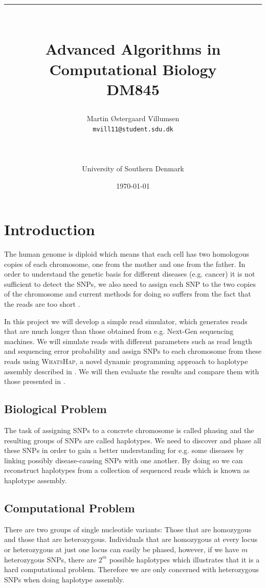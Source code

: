 \documentclass[10pt,a4paper]{article}
\title{\rule{12.5cm}{0.5mm}\\Advanced Algorithms in Computational Biology\\DM845}
\author{Martin Østergaard Villumsen\\\texttt{mvill11@student.sdu.dk}\\\rule{6.5cm}{0.5mm}\\University of Southern Denmark\\}
\date{\today}
\begin{document}
\maketitle
\newpage

\section{Introduction}
The human genome is diploid which means that each cell has two homologous copies of each chromosome, one from the mother and one from the father. In order to understand the genetic basis for different diseases (e.g. cancer) it is not sufficient to detect the SNPs, we also need to assign each SNP to the two copies of the chromosome and current methods for doing so suffers from the fact that the reads are too short \cite{whatshap}.

In this project we will develop a simple read simulator, which generates reads that are much longer than those obtained from e.g. Next-Gen sequencing machines. We will simulate reads with different parameters such as read length and sequencing error probability and assign SNPs to each chromosome from these reads using \textsc{WhatsHap}, a novel dynamic programming approach to haplotype assembly described in \cite{whatshap}. We will then evaluate the results and compare them with those presented in \cite{whatshap}.

\subsection{Biological Problem}
The task of assigning SNPs to a concrete chromosome is called phasing and the resulting groups of SNPs are called haplotypes. We need to discover and phase all these SNPs in order to gain a better understanding for e.g. some diseases by linking possibly disease-causing SNPs with one another. By doing so we can reconstruct haplotypes from a collection of sequenced reads which is known as haplotype assembly.

\subsection{Computational Problem}
There are two groups of single nucleotide variants: Those that are homozygous and those that are heterozygous. Individuals that are homozygous at every locus or heterozygous at just one locus can easily be phased, however, if we have $m$ heterozygous SNPs, there are $2^m$ possible haplotypes which illustrates that it is a hard computational problem. Therefore we are only concerned with heterozygous SNPs when doing haplotype assembly. 
\end{document}
